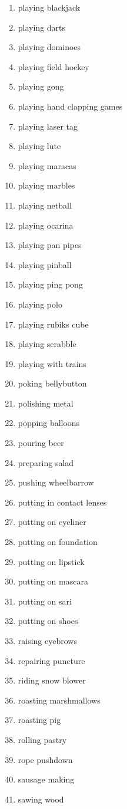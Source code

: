 \documentclass[10pt,twocolumn,letterpaper]{article}
\begin{document}
\begin{enumerate}
\item playing blackjack
\item playing darts
\item playing dominoes
\item playing field hockey
\item playing gong
\item playing hand clapping games
\item playing laser tag
\item playing lute
\item playing maracas
\item playing marbles
\item playing netball
\item playing ocarina
\item playing pan pipes
\item playing pinball
\item playing ping pong
\item playing polo
\item playing rubiks cube
\item playing scrabble
\item playing with trains
\item poking bellybutton
\item polishing metal
\item popping balloons
\item pouring beer
\item preparing salad
\item pushing wheelbarrow
\item putting in contact lenses
\item putting on eyeliner
\item putting on foundation
\item putting on lipstick
\item putting on mascara
\item putting on sari
\item putting on shoes
\item raising eyebrows
\item repairing puncture
\item riding snow blower
\item roasting marshmallows
\item roasting pig
\item rolling pastry
\item rope pushdown
\item sausage making
\item sawing wood

\end{enumerate}
\end{document}
